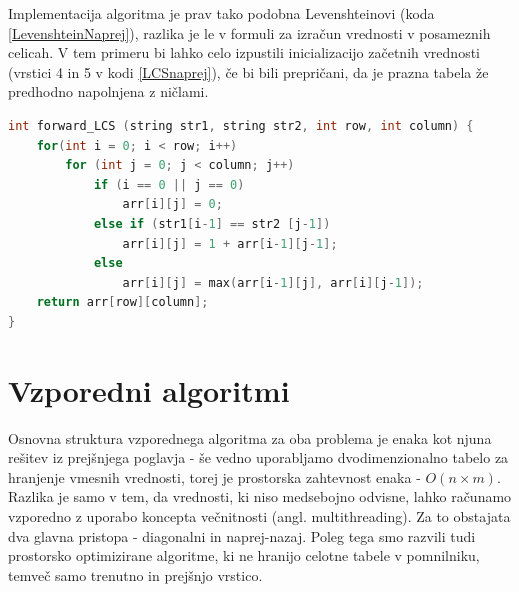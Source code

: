\documentclass[a4paper,12pt,openright]{book}
\begin{document}
Implementacija algoritma je prav tako podobna Levenshteinovi (koda \ref{LevenshteinNaprej}), razlika je le v formuli za izračun vrednosti v posameznih celicah. V tem primeru bi lahko celo izpustili inicializacijo začetnih vrednosti (vrstici 4 in 5 v kodi \ref{LCSnaprej}), če bi bili prepričani, da je prazna tabela že predhodno napolnjena z ničlami. 

\bigskip \bigskip

\begin{lstlisting}[language=C++, caption={Algoritem za izračun LCS}, captionpos=b, label=LCSnaprej]
int forward_LCS (string str1, string str2, int row, int column) {
    for(int i = 0; i < row; i++) 
        for (int j = 0; j < column; j++) 
            if (i == 0 || j == 0)
                arr[i][j] = 0;
            else if (str1[i-1] == str2 [j-1])
                arr[i][j] = 1 + arr[i-1][j-1];
            else
                arr[i][j] = max(arr[i-1][j], arr[i][j-1]);
    return arr[row][column];
}
\end{lstlisting}

\chapter{Vzporedni algoritmi}

Osnovna struktura vzporednega algoritma za oba problema je enaka kot njuna rešitev iz prejšnjega poglavja - še vedno uporabljamo dvodimenzionalno tabelo za hranjenje vmesnih vrednosti, torej je prostorska zahtevnost enaka - $O(n \times m)$. Razlika je samo v tem, da vrednosti, ki niso medsebojno odvisne, lahko računamo vzporedno z uporabo koncepta večnitnosti (angl. multithreading). Za to obstajata dva glavna pristopa - diagonalni in naprej-nazaj. Poleg tega smo razvili tudi prostorsko optimizirane algoritme, ki ne hranijo celotne tabele v pomnilniku, temveč samo trenutno in prejšnjo vrstico. 
\end{document}
